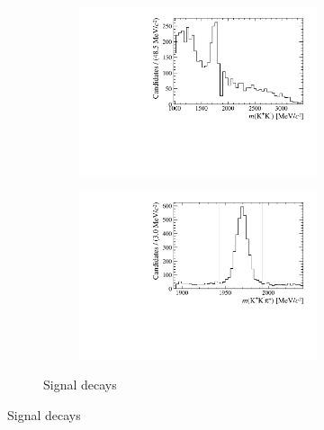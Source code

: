 \begin{figure}[!h]
   \centering
   \begin{subfigure}[t]{1.0\textwidth}
      \centering
      \begin{subfigure}[t]{0.40\textwidth}
         \centering
         \includegraphics[width=1.0\textwidth]{figs/Selection/Phimass_KKPi_B2DsKK.pdf}
      \end{subfigure}
      \begin{subfigure}[t]{0.40\textwidth}
         \centering
         \includegraphics[width=1.0\textwidth]{figs/Selection/Dmass_KKPi_B2DsKK.pdf}
      \end{subfigure}
         \caption{Signal \decay{\Bp}{\Dsp\Kp\Km} decays}
   \end{subfigure} 

\end{figure}
